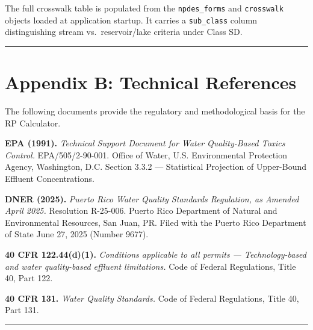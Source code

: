 \documentclass[
  11pt,
  letterpaper,
  DIV=11,
  numbers=noendperiod]{scrartcl}
\begin{document}
\begin{tcolorbox}[enhanced jigsaw, arc=.35mm, bottomrule=.15mm, bottomtitle=1mm, breakable, colback=white, colbacktitle=quarto-callout-note-color!10!white, colframe=quarto-callout-note-color-frame, coltitle=black, left=2mm, leftrule=.75mm, opacityback=0, opacitybacktitle=0.6, rightrule=.15mm, title=\textcolor{quarto-callout-note-color}{\faInfo}\hspace{0.5em}{Note}, titlerule=0mm, toprule=.15mm, toptitle=1mm]

The full crosswalk table is populated from the \texttt{npdes\_forms} and
\texttt{crosswalk} objects loaded at application startup. It carries a
\texttt{sub\_class} column distinguishing stream vs.~reservoir/lake
criteria under Class SD.

\end{tcolorbox}

\begin{center}\rule{0.5\linewidth}{0.5pt}\end{center}

\section{Appendix B: Technical References}\label{sec-appendix-refs}

The following documents provide the regulatory and methodological basis
for the RP Calculator.

\textbf{EPA (1991).} \emph{Technical Support Document for Water
Quality-Based Toxics Control.} EPA/505/2-90-001. Office of Water, U.S.
Environmental Protection Agency, Washington, D.C. Section 3.3.2 ---
Statistical Projection of Upper-Bound Effluent Concentrations.

\textbf{DNER (2025).} \emph{Puerto Rico Water Quality Standards
Regulation, as Amended April 2025.} Resolution R-25-006. Puerto Rico
Department of Natural and Environmental Resources, San Juan, PR. Filed
with the Puerto Rico Department of State June 27, 2025 (Number 9677).

\textbf{40 CFR 122.44(d)(1).} \emph{Conditions applicable to all permits
--- Technology-based and water quality-based effluent limitations.} Code
of Federal Regulations, Title 40, Part 122.

\textbf{40 CFR 131.} \emph{Water Quality Standards.} Code of Federal
Regulations, Title 40, Part 131.

\begin{center}\rule{0.5\linewidth}{0.5pt}\end{center}
\end{document}
